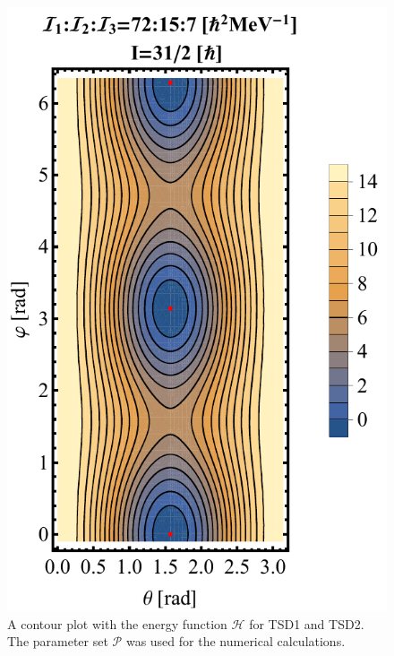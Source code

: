 \documentclass[%
 reprint,
 amsmath,
 amssymb,
 aps,
 floatfix,
]{revtex4-2}
\begin{document}
\begin{figure}
    \includegraphics[scale=0.55]{images/contour-tsd2.pdf}
    \caption{A contour plot with the energy function $\mathcal{H}$ for TSD1 and TSD2. The parameter set $\mathcal{P}$ was used for the numerical calculations.}
    \label{contour-tsd1}
\end{figure}

\end{document}
